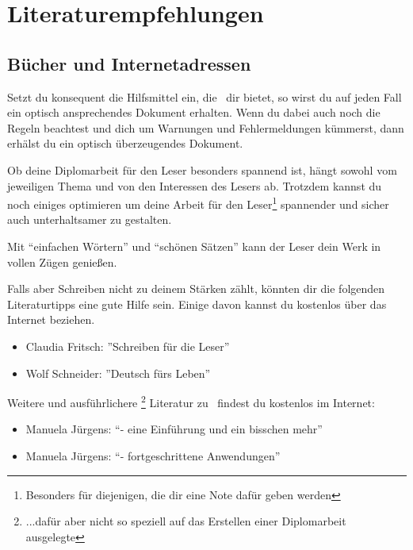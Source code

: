 
%

\chapter{Literaturempfehlungen}

\section{Bücher und Internetadressen}

Setzt du konsequent die Hilfsmittel ein, die \DMLLaTeX \ dir bietet, so wirst du auf jeden Fall ein optisch ansprechendes Dokument erhalten. Wenn du dabei auch noch die Regeln beachtest und dich um Warnungen und Fehlermeldungen kümmerst, dann erhälst du ein optisch überzeugendes Dokument.

Ob deine Diplomarbeit für den Leser besonders spannend ist, hängt sowohl vom jeweiligen Thema und von den Interessen des Lesers ab. Trotzdem kannst du noch einiges optimieren um deine Arbeit für den Leser\footnote{Besonders für diejenigen, die dir eine Note dafür geben werden} spannender und sicher auch unterhaltsamer zu gestalten.

Mit \enquote{einfachen Wörtern} und \enquote{schönen Sätzen} kann der Leser dein Werk in vollen Zügen genießen.

Falls aber Schreiben nicht zu deinem Stärken zählt, könnten dir die folgenden Literaturtipps eine gute Hilfe sein. Einige davon kannst du kostenlos über das Internet beziehen.

\begin{itemize}
	\item{Claudia Fritsch: ''Schreiben für die Leser''\cite{fritsch:schreiben_fuer_die_Leser}}
	\item{Wolf Schneider: ''Deutsch fürs Leben''\cite{schneider:deutsch_fuers_leben}}
\end{itemize}

Weitere und ausführlichere \footnote{...dafür aber nicht so speziell auf das Erstellen einer Diplomarbeit ausgelegte} Literatur zu \DMLLaTeX \ findest du  kostenlos im Internet:

\begin{itemize}
	\item{Manuela Jürgens: \enquote{\DMLLaTeX - eine Einführung und ein bisschen mehr}\cite{juergens:latex1}}
	\item{Manuela Jürgens: \enquote{\DMLLaTeX - fortgeschrittene Anwendungen}\cite{juergens:latex2}}
\end{itemize}

